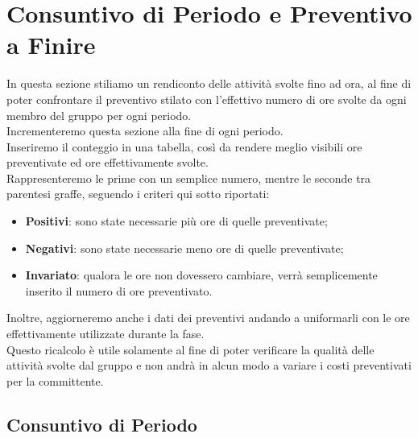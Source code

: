 \section{Consuntivo di Periodo e Preventivo a Finire}
\label{CFPPAF}

In questa sezione stiliamo un rendiconto delle attività svolte fino ad ora, al fine di poter confrontare il preventivo stilato con l'effettivo numero di ore svolte da ogni membro del gruppo per ogni periodo.\\
Incrementeremo questa sezione alla fine di ogni periodo.\\
Inseriremo il conteggio in una tabella, così da rendere meglio visibili ore preventivate ed ore effettivamente svolte.\\
Rappresenteremo le prime con un semplice numero, mentre le seconde tra parentesi graffe, seguendo i criteri qui sotto riportati:
\begin{itemize}
	\item \textbf{Positivi}: sono state necessarie più ore di quelle preventivate;
	\item \textbf{Negativi}: sono state necessarie meno ore di quelle preventivate;
	\item \textbf{Invariato}: qualora le ore non dovessero cambiare, verrà semplicemente inserito il numero di ore preventivato.	
\end{itemize}

Inoltre, aggiorneremo anche i dati dei preventivi andando a uniformarli con le ore effettivamente utilizzate durante la fase.\\
Questo ricalcolo è utile solamente al fine di poter verificare la qualità delle attività svolte dal gruppo e non andrà in alcun modo a variare i costi preventivati per la committente.

\newpage

\subsection{Consuntivo di Periodo}
\label{CFP}









